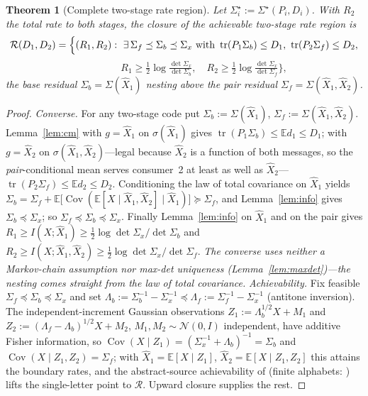 \documentclass[lettersize,onecolumn]{IEEEtran}
\newtheorem{theorem}{Theorem}
\theoremstyle{definition}
\theoremstyle{remark}
\newcommand{\tr}{\operatorname{tr}}
\newcommand{\E}{\mathbb{E}}
\newcommand{\Cov}{\operatorname{Cov}}
\begin{document}
\begin{theorem}[Complete two-stage rate region]\label{thm:region}
Let $\Sigma_i^\star:=\Sigma^\star(P_i,D_i)$. With $R_2$ the total rate to both stages, the
closure of the achievable two-stage rate region is
\[
\mathcal R(D_1,D_2)=\Bigl\{(R_1,R_2):\ \exists\,\Sigma_f\preceq\Sigma_b\preceq\Sigma_x
\text{ with }\tr(P_1\Sigma_b)\le D_1,\ \tr(P_2\Sigma_f)\le D_2,
\]
\[
\qquad\qquad R_1\ge\tfrac12\log\tfrac{\det\Sigma_x}{\det\Sigma_b},\quad
R_2\ge\tfrac12\log\tfrac{\det\Sigma_x}{\det\Sigma_f}\Bigr\},
\]
the base residual $\Sigma_b=\Sigma(\hat X_1)$ nesting above the pair residual
$\Sigma_f=\Sigma(\hat X_1,\hat X_2)$.
\end{theorem}
\begin{proof}
\emph{Converse.} For any two-stage code put $\Sigma_b:=\Sigma(\hat X_1)$,
$\Sigma_f:=\Sigma(\hat X_1,\hat X_2)$. Lemma~\ref{lem:cm} with $g=\hat X_1$ on
$\sigma(\hat X_1)$ gives $\tr(P_1\Sigma_b)\le\E d_1\le D_1$; with $g=\hat X_2$ on
$\sigma(\hat X_1,\hat X_2)$---legal because $\hat X_2$ is a function of both messages, so
the \emph{pair}-conditional mean serves consumer~2 at least as well as $\hat
X_2$---$\tr(P_2\Sigma_f)\le\E d_2\le D_2$. Conditioning the law of total covariance on
$\hat X_1$ yields $\Sigma_b=\Sigma_f+\E\bigl[\Cov(\E[X\mid\hat X_1,\hat X_2]\mid\hat
X_1)\bigr]\succeq\Sigma_f$, and Lemma~\ref{lem:info} gives $\Sigma_b\preceq\Sigma_x$; so
$\Sigma_f\preceq\Sigma_b\preceq\Sigma_x$. Finally Lemma~\ref{lem:info} on $\hat X_1$ and
on the pair gives $R_1\ge I(X;\hat X_1)\ge\tfrac12\log\det\Sigma_x/\det\Sigma_b$ and
$R_2\ge I(X;\hat X_1,\hat X_2)\ge\tfrac12\log\det\Sigma_x/\det\Sigma_f$. \emph{The converse
uses neither a Markov-chain assumption nor max-det uniqueness
(Lemma~\ref{lem:maxdet})---the nesting comes straight from the law of total covariance.} \emph{Achievability.} Fix feasible $\Sigma_f\preceq\Sigma_b
\preceq\Sigma_x$ and set $\Lambda_b:=\Sigma_b^{-1}-\Sigma_x^{-1}\preceq\Lambda_f:=
\Sigma_f^{-1}-\Sigma_x^{-1}$ (antitone inversion). The independent-increment Gaussian
observations $Z_1:=\Lambda_b^{1/2}X+M_1$ and $Z_2:=(\Lambda_f-\Lambda_b)^{1/2}X+M_2$,
$M_1,M_2\sim\mathcal N(0,I)$ independent, have additive Fisher information, so
$\Cov(X\mid Z_1)=(\Sigma_x^{-1}+\Lambda_b)^{-1}=\Sigma_b$ and $\Cov(X\mid Z_1,Z_2)=
\Sigma_f$; with $\hat X_1=\E[X\mid Z_1]$, $\hat X_2=\E[X\mid Z_1,Z_2]$ this attains the
boundary rates, and the abstract-source achievability of \cite{kostinatuncel} (finite
alphabets: \cite{rimoldi}) lifts the single-letter point to $\mathcal R$. Upward closure
supplies the rest.
\end{proof}
\end{document}
